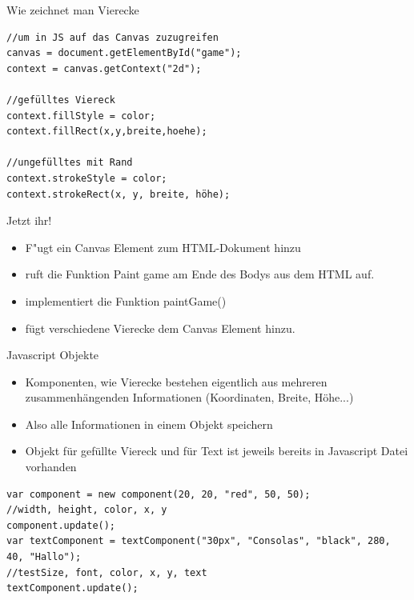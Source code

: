 \documentclass[18pt]{beamer}
\begin{document}
\begin{frame}[fragile]{Wie zeichnet man Vierecke}
\begin{lstlisting}
//um in JS auf das Canvas zuzugreifen
canvas = document.getElementById("game");
context = canvas.getContext("2d");

//gefülltes Viereck
context.fillStyle = color;
context.fillRect(x,y,breite,hoehe);

//ungefülltes mit Rand
context.strokeStyle = color;
context.strokeRect(x, y, breite, höhe);
\end{lstlisting}

\end{frame}

\begin{frame}{Jetzt ihr!}
\begin{itemize}
	\item F"ugt ein Canvas Element zum HTML-Dokument hinzu
	\item ruft die Funktion Paint game am Ende des Bodys aus dem HTML auf. 
	\item implementiert die Funktion paintGame() 
	\item fügt verschiedene Vierecke dem Canvas Element hinzu. 
\end{itemize}
\end{frame}

\begin{frame}[fragile]{Javascript Objekte}
\begin{itemize}
	\item Komponenten, wie Vierecke bestehen eigentlich aus mehreren zusammenhängenden Informationen (Koordinaten, Breite, Höhe...)
	\item Also alle Informationen in einem Objekt speichern 
	\item Objekt für gefüllte Viereck und für Text ist jeweils bereits in Javascript Datei vorhanden 
	
\end{itemize}
 \begin{lstlisting}
var component = new component(20, 20, "red", 50, 50);
//width, height, color, x, y
component.update();
var textComponent = textComponent("30px", "Consolas", "black", 280, 40, "Hallo");
//testSize, font, color, x, y, text
textComponent.update();
\end{lstlisting}
\end{frame}
\end{document}
